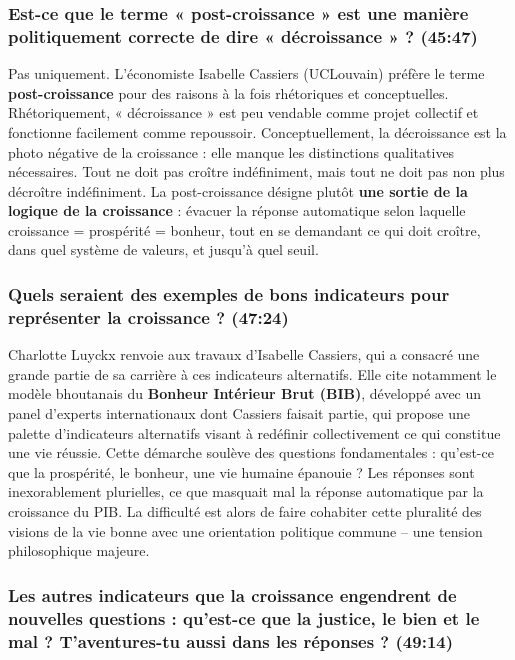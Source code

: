 \subsubsection{Est-ce que le terme « post-croissance » est une manière politiquement correcte de dire « décroissance » ? \textnormal{\small(45:47)}}

Pas uniquement. L'économiste Isabelle Cassiers (UCLouvain) préfère le terme \textbf{post-croissance} pour des raisons à la fois rhétoriques et conceptuelles. Rhétoriquement, « décroissance » est peu vendable comme projet collectif et fonctionne facilement comme repoussoir. Conceptuellement, la décroissance est la photo négative de la croissance : elle manque les distinctions qualitatives nécessaires. Tout ne doit pas croître indéfiniment, mais tout ne doit pas non plus décroître indéfiniment. La post-croissance désigne plutôt \textbf{une sortie de la logique de la croissance} : évacuer la réponse automatique selon laquelle croissance = prospérité = bonheur, tout en se demandant ce qui doit croître, dans quel système de valeurs, et jusqu'à quel seuil.

\subsubsection{Quels seraient des exemples de bons indicateurs pour représenter la croissance ? \textnormal{\small(47:24)}}

Charlotte Luyckx renvoie aux travaux d'Isabelle Cassiers, qui a consacré une grande partie de sa carrière à ces indicateurs alternatifs. Elle cite notamment le modèle bhoutanais du \textbf{Bonheur Intérieur Brut (BIB)}, développé avec un panel d'experts internationaux dont Cassiers faisait partie, qui propose une palette d'indicateurs alternatifs visant à redéfinir collectivement ce qui constitue une vie réussie. Cette démarche soulève des questions fondamentales : qu'est-ce que la prospérité, le bonheur, une vie humaine épanouie ? Les réponses sont inexorablement plurielles, ce que masquait mal la réponse automatique par la croissance du PIB. La difficulté est alors de faire cohabiter cette pluralité des visions de la vie bonne avec une orientation politique commune -- une tension philosophique majeure.

\subsubsection{Les autres indicateurs que la croissance engendrent de nouvelles questions : qu'est-ce que la justice, le bien et le mal ? T'aventures-tu aussi dans les réponses ? \textnormal{\small(49:14)}}

